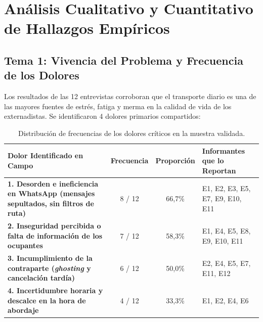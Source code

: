 \documentclass[11pt,a4paper]{article}
\begin{document}
\section{An\'alisis Cualitativo y Cuantitativo de Hallazgos Emp\'iricos}

\subsection{Tema 1: Vivencia del Problema y Frecuencia de los Dolores}
Los resultados de las 12 entrevistas corroboran que el transporte diario es una de las mayores fuentes de estr\'es, fatiga y merma en la calidad de vida de los externadistas. Se identificaron 4 dolores primarios compartidos:

\begin{table}[!htbp]
\centering
\small
\renewcommand{\arraystretch}{1.2}
\begin{tabularx}{\textwidth}{>{\raggedright\arraybackslash\bfseries}p{4.8cm}ccX}
\toprule
Dolor Identificado en Campo & Frecuencia & Proporci\'on & Informantes que lo Reportan \\
\midrule
1. Desorden e ineficiencia en WhatsApp (mensajes sepultados, sin filtros de ruta) & 8 / 12 & 66,7\% & E1, E2, E3, E5, E7, E9, E10, E11 \\
2. Inseguridad percibida o falta de informaci\'on de los ocupantes & 7 / 12 & 58,3\% & E1, E4, E5, E8, E9, E10, E11 \\
3. Incumplimiento de la contraparte (\textit{ghosting} y cancelaci\'on tard\'ia) & 6 / 12 & 50,0\% & E2, E4, E5, E7, E11, E12 \\
4. Incertidumbre horaria y descalce en la hora de abordaje & 4 / 12 & 33,3\% & E1, E2, E4, E6 \\
\bottomrule
\end{tabularx}
\caption{Distribuci\'on de frecuencias de los dolores cr\'iticos en la muestra validada.}
\label{tab:frecuencias_dolor}
\end{table}
\end{document}
